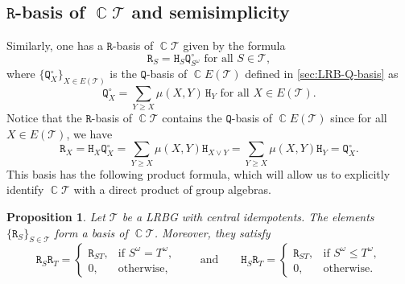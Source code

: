 \documentclass[11pt, oneside, reqno]{amsart}
\newtheorem{prop}[theorem]{Proposition}
\theoremstyle{definition}
\numberwithin{equation}{section}
\DeclareMathOperator{\C}{\mathbb{C}}
\def \TT{{\mathcal{T}}}
\def \kk{\C}
\def\qqand{\qquad\text{and}\qquad}
\newcommand{\B}[1]{\mathtt{#1}} 			%
\begin{document}
\subsection{$\B{R}$-basis of $\kk \TT$ and semisimplicity}
\label{sec:R-basis-for-T}

Similarly, one has a $\B{R}$-basis of $\kk \TT$
given by the formula
\begin{equation*}
    \B{R}_{S} = \B{H}_{S} \B{Q}^\circ_{S^\omega}
    \text{~for all~} S \in \TT,
\end{equation*}
where $\{\B{Q}^\circ_{X}\}_{X \in E(\TT)}$ is the $\B{Q}$-basis of $\kk E(\TT)$ defined
in \cref{sec:LRB-Q-basis} as
\[
    \B{Q}^\circ_X = \sum_{Y \geq X} \mu(X,Y) \, \B{H}_Y \text{ for all } X \in E(\TT).
\]
Notice that the $\B{R}$-basis of $\kk \TT$ contains the $\B{Q}$-basis of $\kk E(\TT)$ since
for all $X \in E(\TT)$, we have
\begin{equation}
    \label{R-basis-contains-Q0-basis}
    \B{R}_X = \B{H}_X \B{Q}^\circ_X = \sum_{Y \geq X} \mu(X,Y) \B{H}_{X \vee Y} = \sum_{Y \geq X} \mu(X,Y) \B{H}_{Y} = \B{Q}^\circ_X.
\end{equation}
This basis has the following product formula,
which will allow us to explicitly identify
$\kk \TT$ with a direct product of group algebras.

\begin{prop}
    \label{T-R-basis-product-formula}
    Let $\TT$ be a LRBG with central idempotents.
    The elements $\{ \B{R}_S \}_{S \in \TT}$ form a basis of $\kk\TT$.
    Moreover, they satisfy
    \[
        \B{R}_S \B{R}_T =
        \begin{cases}
            \B{R}_{ST},      & \text{if~} S^\omega = T^\omega, \\
            0,               & \text{otherwise,}
        \end{cases}
        \qqand
        \B{H}_{S} \B{R}_{T} =
        \begin{cases}
            \B{R}_{ST},      & \text{if~} S^\omega \leq T^\omega, \\
            0,               & \text{otherwise.}
        \end{cases}
    \]
\end{prop}
\end{document}
